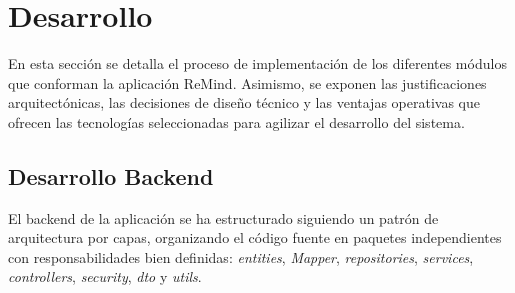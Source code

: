 \chapter{Desarrollo}
En esta sección se detalla el proceso de implementación de los diferentes módulos que conforman la aplicación ReMind. Asimismo, se exponen las justificaciones arquitectónicas, las decisiones de diseño técnico y las ventajas operativas que ofrecen las tecnologías seleccionadas para agilizar el desarrollo del sistema.

\section{Desarrollo Backend}
El backend de la aplicación se ha estructurado siguiendo un patrón de arquitectura por capas, organizando el código fuente en paquetes independientes con responsabilidades bien definidas: \textit{entities}, \textit{Mapper}, \textit{repositories}, \textit{services}, \textit{controllers}, \textit{security}, \textit{dto} y \textit{utils}.

